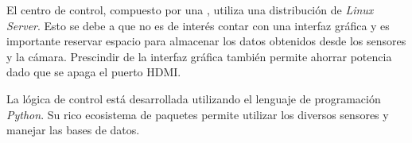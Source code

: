 El centro de control, compuesto por una \rspi, utiliza una distribución de \textit{Linux Server}. Esto se debe a que no es de interés contar con una interfaz gráfica y es importante reservar espacio para almacenar los datos obtenidos desde los sensores y la cámara. Prescindir de la interfaz gráfica también permite ahorrar potencia dado que se apaga el puerto HDMI.


La lógica de control está desarrollada utilizando el lenguaje de programación \textit{Python}. Su rico ecosistema de paquetes permite utilizar los diversos sensores y manejar las bases de datos.

